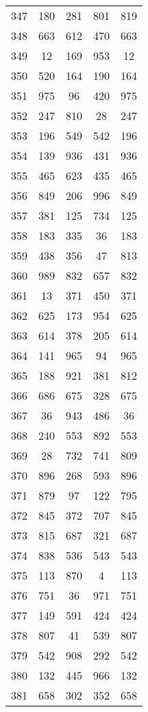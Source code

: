 \documentclass[a4paper,10pt,ngerman]{scrartcl}
\begin{document}
\begin{longtable}[c]{c|c|c|c|c}
    347 & 180 & 281 & 801 & 819 \\
    348 & 663 & 612 & 470 & 663 \\
    349 & 12 & 169 & 953 & 12 \\
    350 & 520 & 164 & 190 & 164 \\
    351 & 975 & 96 & 420 & 975 \\
    352 & 247 & 810 & 28 & 247 \\
    353 & 196 & 549 & 542 & 196 \\
    354 & 139 & 936 & 431 & 936 \\
    355 & 465 & 623 & 435 & 465 \\
    356 & 849 & 206 & 996 & 849 \\
    357 & 381 & 125 & 734 & 125 \\
    358 & 183 & 335 & 36 & 183 \\
    359 & 438 & 356 & 47 & 813 \\
    360 & 989 & 832 & 657 & 832 \\
    361 & 13 & 371 & 450 & 371 \\
    362 & 625 & 173 & 954 & 625 \\
    363 & 614 & 378 & 205 & 614 \\
    364 & 141 & 965 & 94 & 965 \\
    365 & 188 & 921 & 381 & 812 \\
    366 & 686 & 675 & 328 & 675 \\
    367 & 36 & 943 & 486 & 36 \\
    368 & 240 & 553 & 892 & 553 \\
    369 & 28 & 732 & 741 & 809 \\
    370 & 896 & 268 & 593 & 896 \\
    371 & 879 & 97 & 122 & 795 \\
    372 & 845 & 372 & 707 & 845 \\
    373 & 815 & 687 & 321 & 687 \\
    374 & 838 & 536 & 543 & 543 \\
    375 & 113 & 870 & 4 & 113 \\
    376 & 751 & 36 & 971 & 751 \\
    377 & 149 & 591 & 424 & 424 \\
    378 & 807 & 41 & 539 & 807 \\
    379 & 542 & 908 & 292 & 542 \\
    380 & 132 & 445 & 966 & 132 \\
    381 & 658 & 302 & 352 & 658 \\

\end{longtable}
\end{document}
